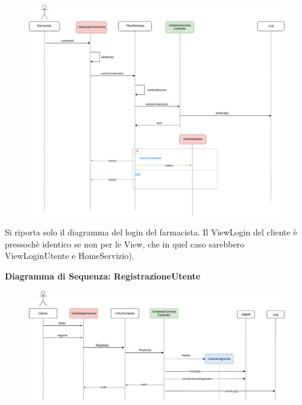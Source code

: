 \begin{figure}[h!]
    \begin{center}
        \includegraphics[width=\textwidth]{immagini/Interazione-LoginUtente-progettaz.jpg}
    \end{center}
\end{figure}

Si riporta solo il diagramma del login del farmacista. Il ViewLogin del cliente è
pressochè identico se non per le View, che in quel caso sarebbero ViewLoginUtente e HomeServizio).

\newpage

\textbf{Diagramma di Sequenza: RegistrazioneUtente}

\begin{figure}[h!]
    \begin{center}
        \includegraphics[width=\textwidth]{immagini/Interazione-RegistrazioneUtente-progettaz.jpg}
    \end{center}
\end{figure}


